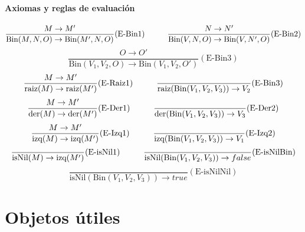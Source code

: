 \paragraph{Axiomas y reglas de evaluación}
\begin{equation*}
	\frac{M\to M'}{\text{Bin}(M,N,O)\to \text{Bin}(M',N,O)}(\text{E-Bin1})\hspace*{1cm}\frac{N\to N'}{\text{Bin}(V,N,O)\to \text{Bin}(V,N',O)}(\text{E-Bin2})
\end{equation*}
\vspace*{5mm}
\begin{equation*}
	\frac{O\to O'}{\text{Bin}(V_1,V_2,O)\to \text{Bin}(V_1,V_2,O')}(\text{E-Bin3})
\end{equation*}
\vspace*{5mm}
\begin{equation*}
	\frac{M\to M'}{\text{raiz}(M)\to\text{raiz}(M')}(\text{E-Raiz1})\hspace*{1cm}\frac{}{\text{raiz}(\text{Bin}(V_1,V_2,V_3))\to V_2}(\text{E-Bin3})
\end{equation*}
\vspace*{5mm}
\begin{equation*}
	\frac{M\to M'}{\text{der}(M)\to\text{der}(M')}(\text{E-Der1})\hspace*{1cm}\frac{}{\text{der}(\text{Bin}(V_1,V_2,V_3))\to V_3}(\text{E-Der2})
\end{equation*}
\vspace*{5mm}
\begin{equation*}
	\frac{M\to M'}{\text{izq}(M)\to\text{izq}(M')}(\text{E-Izq1})\hspace*{1cm}\frac{}{\text{izq}(\text{Bin}(V_1,V_2,V_3))\to V_1}(\text{E-Izq2})
\end{equation*}
\hspace*{5mm}
\begin{equation*}
	\frac{}{\text{isNil}(M)\to\text{izq}(M')}(\text{E-isNil1})\hspace*{1cm}\frac{}{\text{isNil}(\text{Bin}(V_1,V_2,V_3))\to false}(\text{E-isNilBin})
\end{equation*}
\hspace*{5mm}
\begin{equation*}
	\frac{}{\text{isNil}(\text{Bin}(V_1,V_2,V_3))\to true}(\text{E-isNilNil})
\end{equation*}

\newpage
\section{Objetos útiles}

%